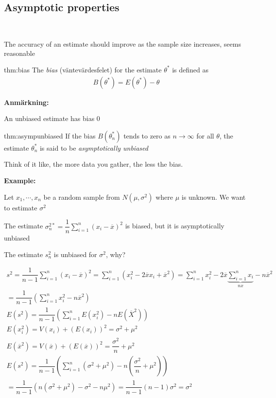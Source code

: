 \subsection{Asymptotic properties}\hfill\\\par
\noindent The accuracy of an estimate should improve as the sample size increases, seems reasonable
\par\bigskip
\begin{theo}[Bias]{thm:bias}
  The \textit{bias} (väntevärdesfelet) for the estimate $\theta^*$ is defined as
  \begin{equation*}
    \begin{gathered}
      B(\theta^*) = E(\theta^*)-\theta
    \end{gathered}
  \end{equation*}
\end{theo}
\par\bigskip
\noindent\textbf{Anmärkning:}\par
\noindent An unbiased estimate has bias 0
\par\bigskip
\begin{theo}{thm:asympunbiased}
  If the bias $B(\theta_n^*)$ tends to zero as $n\to\infty$ for all $\theta$, the estimate $\theta_n^*$ is said to be \textit{asymptotically unbiased}
  \par\bigskip
  \noindent Think of it like, the more data you gather, the less the bias.
\end{theo}
\par\bigskip
\noindent\textbf{Example:}\par
\noindent Let $x_1,\cdots,x_n$ be a random sample from $N(\mu,\sigma^2)$ where $\mu$ is unknown. We want to estimate $\sigma^2$
\par\bigskip
\noindent The estimate $\sigma_n^{2*} = \dfrac{1}{n}\sum_{i=1}^{n}(x_i-\overline{x})^2$ is biased, but it is asymptotically unbiased
\par\bigskip
\noindent The estimate $s_n^2$  is unbiased for $\sigma^2$, why?
\par\bigskip
\begin{equation*}
  \begin{gathered}
    s^2 = \dfrac{1}{n-1}\sum_{i=1}^{n}(x_i-\overline{x})^2 = \sum_{i=1}^{n}(x_i^2-2\overline{x}x_i+\overline{x}^2) = \sum_{i=1}^{n}x_i^2-2\overline{x}\underbrace{\sum_{i=1}^{n}x_i}_{\text{$nx$}}-n\overline{x}^2\\
    =\dfrac{1}{n-1}\left(\sum_{i=1}^{n}x_i^2-n\overline{x}^2\right)\\
    E(s^2) = \dfrac{1}{n-1}\left(\sum_{i=1}^{n}E(x_i^2)-nE(\overline{X}^2)\right)\\
    E(x_i^2) = V(x_i) + (E(x_i))^2 = \sigma^2+\mu^2\\
    E(\overline{x}^2) = V(\overline{x}) + (E(\overline{x}))^2 = \dfrac{\sigma^2}{n}+\mu^2\\
    E(s^2) = \dfrac{1}{n-1}\left(\sum_{i=1}^{n}(\sigma^2+\mu^2)-n\left(\dfrac{\sigma^2}{n}+\mu^2\right)\right)\\
    = \dfrac{1}{n-1}\left(n(\sigma^2+\mu^2)-\sigma^2-n\mu^2\right) = \dfrac{1}{n-1}(n-1)\sigma^2 = \sigma^2
  \end{gathered}
\end{equation*}
